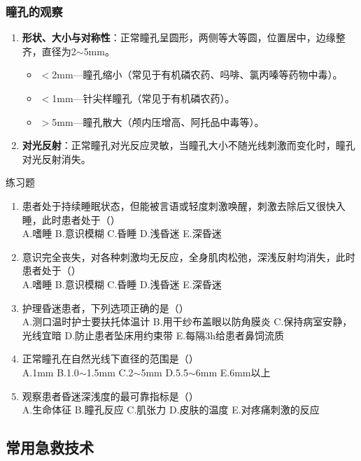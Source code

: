 \documentclass[11pt, a4paper]{ctexart}
\begin{document}
\subsubsection{瞳孔的观察}
\begin{enumerate}
	\item \textbf{形状、大小与对称性}：正常瞳孔呈圆形，两侧等大等圆，位置居中，边缘整齐，直径为2$\sim$5mm。
	      \begin{itemize}
		      \item $<$2mm—瞳孔缩小（常见于有机磷农药、吗啡、氯丙嗪等药物中毒）。
		      \item $<$1mm—针尖样瞳孔（常见于有机磷农药）。
		      \item $>$5mm—瞳孔散大（颅内压增高、阿托品中毒等）。
	      \end{itemize}
	\item \textbf{对光反射}：正常瞳孔对光反应灵敏，当瞳孔大小不随光线刺激而变化时，瞳孔对光反射消失。
\end{enumerate}

\begin{examplebox}{练习题}
	\begin{enumerate}
		\item 患者处于持续睡眠状态，但能被言语或轻度刺激唤醒，刺激去除后又很快入睡，此时患者处于（\qquad）\\
		      A.嗜睡 \quad B.意识模糊 \quad C.昏睡 \quad D.浅昏迷 \quad E.深昏迷
		\item 意识完全丧失，对各种刺激均无反应，全身肌肉松弛，深浅反射均消失，此时患者处于（\qquad）\\
		      A.嗜睡 \quad B.意识模糊 \quad C.昏睡 \quad D.浅昏迷 \quad E.深昏迷
		\item 护理昏迷患者，下列选项正确的是（\qquad）\\
		      A.测口温时护士要扶托体温计 \quad B.用干纱布盖眼以防角膜炎 \quad C.保持病室安静，光线宜暗 \quad D.防止患者坠床用约束带 \quad E.每隔3h给患者鼻饲流质
		\item 正常瞳孔在自然光线下直径的范围是（\qquad）\\
		      A.1mm \quad B.1.0$\sim$1.5mm \quad C.2$\sim$5mm \quad D.5.5$\sim$6mm \quad E.6mm以上
		\item 观察患者昏迷深浅度的最可靠指标是（\qquad）\\
		      A.生命体征 \quad B.瞳孔反应 \quad C.肌张力 \quad D.皮肤的温度 \quad E.对疼痛刺激的反应
	\end{enumerate}
\end{examplebox}

\subsection{常用急救技术}
\end{document}
